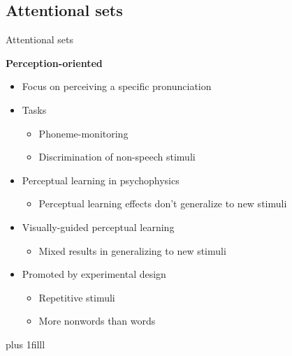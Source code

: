 \documentclass{beamer}
\newcommand{\btVFill}{\vskip0pt plus 1filll}
\begin{document}
\subsection{Attentional sets}

\begin{frame}{Attentional sets}

\textbf{Perception-oriented}
\begin{itemize}
\item Focus on perceiving a specific pronunciation
\item Tasks
\begin{itemize}
\item Phoneme-monitoring
\item Discrimination of non-speech stimuli
\end{itemize}
\item Perceptual learning in psychophysics
\begin{itemize}
\item Perceptual learning effects don't generalize to new stimuli
\end{itemize}
\item Visually-guided perceptual learning
\begin{itemize}
\item Mixed results in generalizing to new stimuli
\end{itemize}
\item Promoted by experimental design
\begin{itemize}
\item Repetitive stimuli
\item More nonwords than words
\end{itemize}
\end{itemize}

\btVFill
\begin{flushright}
\scriptsize
\citet{Cutler1987, Ahissar1993, Pitt2012, Reinisch2014}
\end{flushright}


\end{frame}
\end{document}
